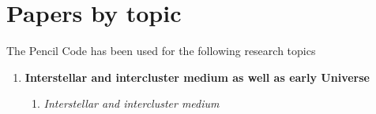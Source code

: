\documentclass[12pt]{article}
\begin{document}
\section{Papers by topic}

The {\sc Pencil Code} has been used for the following research topics
\begin{enumerate}

\item
{\bf Interstellar and intercluster medium as well as early Universe}

\begin{enumerate}
\item
{\em Interstellar and intercluster medium} \citep{
2024GMS...283..179C,%
2024LRCA...10....3K,%
2024A&A...690A..77E,%
2023A&A...677A..46E,%
2023MNRAS.523.1056P,%
2023ApJ...943..176G,%
2022MNRAS.513.2136B,%
2021arXiv210801936M,%
2021ApJ...910L..15G,%
2021A&A...648A..52L,%
2020ApJ...896...86C,%
2020ApJ...903..148L,%
2020MNRAS.496.4749B,%
2020ApJ...896L..14B,%
2020GApFD.114...77G,%
2019arXiv190808781E,%
2019MNRAS.488.5065E,%
2019Galax...7...45S,%
2019MNRAS.487..975R,%
}
\end{enumerate}
\end{enumerate}
\end{document}
